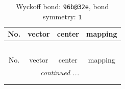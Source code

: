 \documentclass[fleqn,8pt]{jsarticle}
\begin{document}
\renewcommand{\arraystretch}{1.2}
\begin{longtable}{cccc}
\caption{Wyckoff bond: {\tt 96b@32e}, bond symmetry: {\tt 1}}
 \\
 \hline \hline
No. & vector & center & mapping \\ \hline \endfirsthead

\multicolumn{3}{l}{\tablename\ \thetable{}} \\
 \hline \hline
No. & vector & center & mapping \\ \hline \endhead

 \hline \hline
\multicolumn{3}{r}{\footnotesize\it continued ...} \\ \endfoot

 \hline \hline
\multicolumn{3}{r}{} \\ \endlastfoot


\end{longtable}
\end{document}
